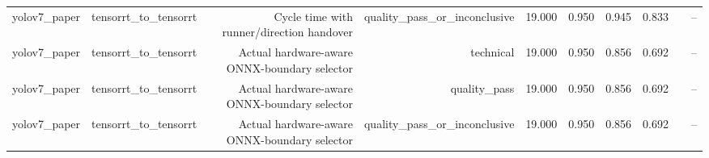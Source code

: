 \begin{table}[t]
\begin{tabular}{lrrrrrrrrr}
yolov7\_paper & tensorrt\_to\_tensorrt & Cycle time with runner/direction handover & quality\_pass\_or\_inconclusive & 19.000 & 0.950 & 0.945 & 0.833 &  & -- \\
yolov7\_paper & tensorrt\_to\_tensorrt & Actual hardware-aware ONNX-boundary selector & technical & 19.000 & 0.950 & 0.856 & 0.692 &  & -- \\
yolov7\_paper & tensorrt\_to\_tensorrt & Actual hardware-aware ONNX-boundary selector & quality\_pass & 19.000 & 0.950 & 0.856 & 0.692 &  & -- \\
yolov7\_paper & tensorrt\_to\_tensorrt & Actual hardware-aware ONNX-boundary selector & quality\_pass\_or\_inconclusive & 19.000 & 0.950 & 0.856 & 0.692 &  & -- \\
\bottomrule
\end{tabular}
\end{table}
